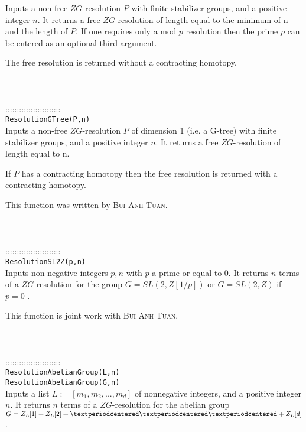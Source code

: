 \documentclass[a4paper,11pt]{report}
\begin{document}
{ Inputs a non-free $ZG$-resolution $P$ with finite stabilizer groups, and a positive integer $n$. It returns a free $ZG$-resolution of length equal to the minimum of n and the length of $P$. If one requires only a mod $p$ resolution then the prime $p$ can be entered as an optional third argument. 

 The free resolution is returned without a contracting homotopy. \\
 \\
 \\
 \\
 ::::::::::::::::::::::::\\
 \texttt{ResolutionGTree(P,n)}\\
 

 Inputs a non-free $ZG$-resolution $P$ of dimension 1 (i.e. a G-tree) with finite stabilizer groups, and a positive
integer $n$. It returns a free $ZG$-resolution of length equal to n. 

 If $P$ has a contracting homotopy then the free resolution is returned with a
contracting homotopy. 

 This function was written by \textsc{ Bui Anh Tuan}. \\
 \\
 \\
 \\
 ::::::::::::::::::::::::\\
 \texttt{ResolutionSL2Z(p,n)}\\
 

 Inputs non-negative integers $p, n$ with $p$ a prime or equal to 0. It returns $n$ terms of a $ZG$-resolution for the group $G=SL(2,Z[1/p])$ or $G=SL(2,Z)$ if $p=0$ . 

 

 This function is joint work with \textsc{Bui Anh Tuan}. \\
 \\
 \\
 \\
 ::::::::::::::::::::::::\\
 \texttt{ResolutionAbelianGroup(L,n)}\\
 \texttt{ResolutionAbelianGroup(G,n)}\\
 

 Inputs a list $L:=[m_1,m_2, ..., m_d]$ of nonnegative integers, and a positive integer $n$. It returns $n$ terms of a $ZG$-resolution for the abelian group $G=Z_L[1]+Z_L[2]+{\textperiodcentered}{\textperiodcentered}{\textperiodcentered}+Z_L[d]$ . 

}
\end{document}
